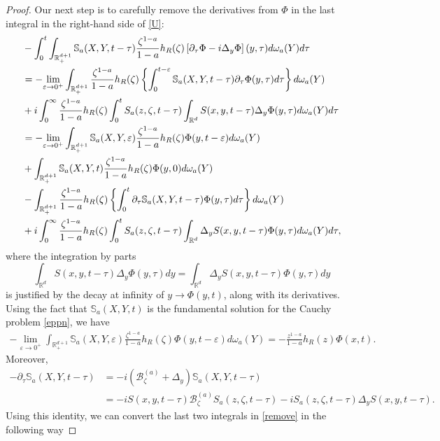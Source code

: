 \documentclass[11pt,letter]{amsart}
\def \RN {\mathbb{R}_+^{d+1}}
\newcommand{\Rd}{\mathbb R^d}
\newcommand{\p}{\partial}
\numberwithin{equation}{section}
\newcommand{\ve}{\varepsilon}
\numberwithin{equation}{section}
\begin{document}
\begin{proof}
Our next step is to carefully remove the derivatives from $\Phi$ in the last integral in the right-hand side of \eqref{U}: 
\begin{align}\label{remove}
& - \int_0^t \int_{\RN} \mathbb S_a(X,Y,t-\tau) \frac{\zeta^{1-a}}{1-a} h_R(\zeta)\left[\p_\tau \Phi - i  \Delta_y \Phi\right](y,\tau) d\omega_a(Y) d\tau
\\
& = - \underset{\ve\to 0^+}{\lim} \int_{\RN} \frac{\zeta^{1-a}}{1-a} h_R(\zeta) \left\{\int_0^{t-\ve} \mathbb S_a(X,Y,t-\tau) \p_\tau \Phi(y,\tau) d\tau\right\} d\omega_a(Y)
\notag
\\
& + i  \int_0^\infty \frac{\zeta^{1-a}}{1-a} h_R(\zeta) \int_0^t S_a(z,\zeta,t-\tau) \int_{\Rd} S(x,y,t-\tau)\Delta_y \Phi(y,\tau) d\omega_a(Y)d\tau
\notag
\\
& = - \underset{\ve\to 0^+}{\lim} \int_{\RN}  \mathbb S_a(X,Y,\ve) \frac{\zeta^{1-a}}{1-a} h_R(\zeta) \Phi(y,t-\ve)  d\omega_a(Y)
\notag
\\
& + \int_{\RN}  \mathbb S_a(X,Y,t) \frac{\zeta^{1-a}}{1-a} h_R(\zeta) \Phi(y,0) d\omega_a(Y)
\notag
\\
& - \int_{\RN} \frac{\zeta^{1-a}}{1-a} h_R(\zeta) \left\{\int_0^{t} \p_\tau \mathbb S_a(X,Y,t-\tau)  \Phi(y,\tau) d\tau\right\} d\omega_a(Y)
\notag
\\
& + i  \int_0^\infty \frac{\zeta^{1-a}}{1-a} h_R(\zeta) \int_0^t S_a(z,\zeta,t-\tau) \int_{\Rd} \Delta_y S(x,y,t-\tau) \Phi(y,\tau) d\omega_a(Y)d\tau,
\notag
\end{align}
where the integration by parts
\[
\int_{\Rd} S(x,y,t-\tau) \Delta_y  \Phi(y,\tau)dy = \int_{\Rd} \Delta_y S(x,y,t-\tau) \Phi(y,\tau)dy
\]
is justified by the decay at infinity of $y\to \Phi(y,t)$, along with its derivatives.
Using the fact that $\mathbb S_a(X,Y,t)$ is the fundamental solution for the Cauchy problem \eqref{eppn}, we have
\begin{align}\label{term}
- \underset{\ve\to 0^+}{\lim} \int_{\RN}  \mathbb S_a(X,Y,\ve) \frac{\zeta^{1-a}}{1-a} h_R(\zeta)\Phi(y,t-\ve)  d\omega_a(Y) = - \frac{z^{1-a}}{1-a} h_R(z)\Phi(x,t).
\end{align}
Moreover, 
\begin{align*}
- \p_\tau \mathbb S_a(X,Y,t-\tau) & = - i (\mathscr B_\zeta^{(a)}  + \Delta_y) \mathbb S_{a}(X,Y,t-\tau)
\\
& = - i S(x,y,t-\tau) \mathscr B_\zeta^{(a)} S_{a}(z,\zeta,t-\tau) - i S_{a}(z,\zeta,t-\tau)
\Delta_y S(x,y,t-\tau).
\end{align*}
Using this identity, we can convert the last two integrals in \eqref{remove} in the following way

\end{proof}
\end{document}
